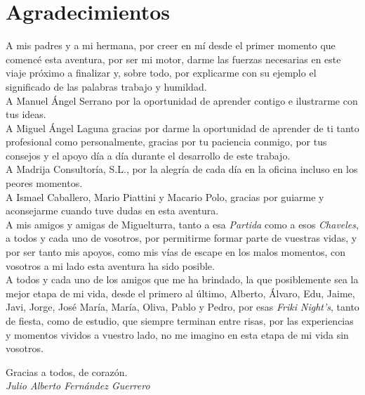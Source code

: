 \chapter{Agradecimientos}

A mis padres y a mi hermana, por creer en mí desde el primer momento que comencé esta aventura, por ser mi motor, darme las fuerzas necesarias en este viaje próximo a finalizar y, sobre todo, por explicarme con su ejemplo el significado de las palabras trabajo y humildad.\\

A Manuel Ángel Serrano por la oportunidad de aprender contigo e ilustrarme con tus ideas.\\

A Miguel Ángel Laguna gracias por darme la oportunidad de aprender de ti tanto profesional como personalmente, gracias por tu paciencia conmigo, por tus consejos y el apoyo día a día durante el desarrollo de este trabajo.\\

A Madrija Consultoría, S.L., por la alegría de cada día en la oficina incluso en los peores momentos.\\

A Ismael Caballero, Mario Piattini y Macario Polo, gracias por guiarme y aconsejarme cuando tuve dudas en esta aventura.\\

A mis amigos y amigas de Miguelturra, tanto a esa \textit{Partida} como a esos \textit{Chaveles}, a todos y cada uno de vosotros, por permitirme formar parte de vuestras vidas, y por ser tanto mis apoyos, como mis vías de escape en los malos momentos, con vosotros a mi lado esta aventura ha sido posible.\\

A todos y cada uno de los amigos que me ha brindado, la que posiblemente sea la mejor etapa de mi vida, desde el primero al último, Alberto, Álvaro, Edu, Jaime, Javi, Jorge, José María, María, Oliva, Pablo y Pedro, por esas \textit{Friki Night's}, tanto de fiesta, como de estudio, que siempre terminan entre risas, por las experiencias y momentos vividos a vuestro lado, no me imagino en esta etapa de mi vida sin vosotros.\\

\begin{flushright}
Gracias a todos, de corazón.\\
\textit{Julio Alberto Fernández Guerrero}
\end{flushright}
